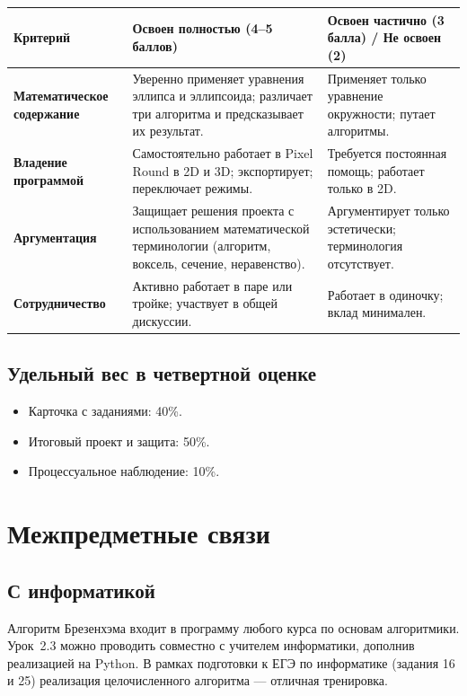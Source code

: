\documentclass[12pt,a4paper]{scrartcl}
\begin{document}
\begin{center}
\small
\begin{tabularx}{\textwidth}{@{}p{}XX@{}}
\toprule
\textbf{Критерий} & \textbf{Освоен полностью (4--5 баллов)} & \textbf{Освоен частично (3 балла) / Не освоен (2)} \\
\midrule
\textbf{Математическое содержание} & Уверенно применяет уравнения эллипса и эллипсоида; различает три алгоритма и предсказывает их результат. & Применяет только уравнение окружности; путает алгоритмы. \\
\addlinespace[3pt]
\textbf{Владение программой} & Самостоятельно работает в Pixel Round в 2D и 3D; экспортирует; переключает режимы. & Требуется постоянная помощь; работает только в 2D. \\
\addlinespace[3pt]
\textbf{Аргументация} & Защищает решения проекта с использованием математической терминологии (алгоритм, воксель, сечение, неравенство). & Аргументирует только эстетически; терминология отсутствует. \\
\addlinespace[3pt]
\textbf{Сотрудничество} & Активно работает в паре или тройке; участвует в общей дискуссии. & Работает в одиночку; вклад минимален. \\
\bottomrule
\end{tabularx}
\end{center}

\subsection{Удельный вес в четвертной оценке}
\begin{itemize}[leftmargin=1.3em,itemsep=0.1em,topsep=0.2em,nosep]
  \item Карточка с заданиями: 40\%.
  \item Итоговый проект и защита: 50\%.
  \item Процессуальное наблюдение: 10\%.
\end{itemize}

\section{Межпредметные связи}

\subsection{С информатикой}
Алгоритм Брезенхэма входит в программу любого курса по основам алгоритмики. Урок~2.3 можно проводить совместно с учителем информатики, дополнив реализацией на Python. В рамках подготовки к ЕГЭ по информатике (задания 16 и 25) реализация целочисленного алгоритма --- отличная тренировка.
\end{document}
